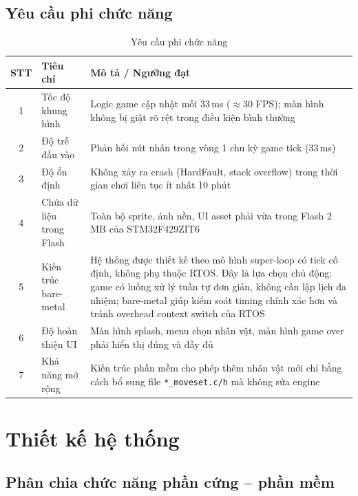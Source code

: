 \documentclass[a4paper,12pt]{report}
\begin{document}
\section{Yêu cầu phi chức năng}

\begin{table}[H]
\centering
\caption{Yêu cầu phi chức năng}
\begin{tabular}{c p{3.5cm} p{8.5cm}}
\toprule
\textbf{STT} & \textbf{Tiêu chí} & \textbf{Mô tả / Ngưỡng đạt} \\
\midrule
1 & Tốc độ khung hình & Logic game cập nhật mỗi 33\,ms ($\approx$30 FPS); màn hình không bị giật rõ rệt trong điều kiện bình thường \\
2 & Độ trễ đầu vào & Phản hồi nút nhấn trong vòng 1 chu kỳ game tick (33\,ms) \\
3 & Độ ổn định & Không xảy ra crash (HardFault, stack overflow) trong thời gian chơi liên tục ít nhất 10 phút \\
4 & Chứa dữ liệu trong Flash & Toàn bộ sprite, ảnh nền, UI asset phải vừa trong Flash 2\,MB của STM32F429ZIT6 \\
5 & Kiến trúc bare-metal & Hệ thống được thiết kế theo mô hình super-loop có tick cố định, không phụ thuộc RTOS. Đây là lựa chọn chủ động: game có luồng xử lý tuần tự đơn giản, không cần lập lịch đa nhiệm; bare-metal giúp kiểm soát timing chính xác hơn và tránh overhead context switch của RTOS \\
6 & Độ hoàn thiện UI & Màn hình splash, menu chọn nhân vật, màn hình game over phải hiển thị đúng và đầy đủ \\
7 & Khả năng mở rộng & Kiến trúc phần mềm cho phép thêm nhân vật mới chỉ bằng cách bổ sung file \texttt{*\_moveset.c/h} mà không sửa engine \\
\bottomrule
\end{tabular}
\end{table}

\chapter{Thiết kế hệ thống}

\section{Phân chia chức năng phần cứng -- phần mềm}
\end{document}
